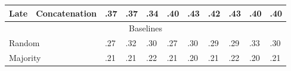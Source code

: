 \documentclass{article}
\begin{document}
\begin{table}[H]
\begin{tabular}{|lllllllllll|}
\multicolumn{1}{|l|}{Late}                   & \multicolumn{1}{l|}{Concatenation} & .37                & .37                & .34                & .40                & .43                & .42                & .43                & \multicolumn{1}{l|}{.40}                & .40                   \\ \hline
\multicolumn{11}{|c|}{Baselines}                                                                                                                                                                                                                                                                       \\ \hline
\multicolumn{2}{|l|}{Random}                                                      & .27                & .32                & .30                & .27                & .30                & .29                & .29                & \multicolumn{1}{l|}{.33}                & .30                   \\
\multicolumn{2}{|l|}{Majority}                                                    & .21                & .21                & .22                & .21                & .20                & .21                & .22                & \multicolumn{1}{l|}{.20}                & .21                   \\ \hline
\end{tabular}
\end{table}
\end{document}
